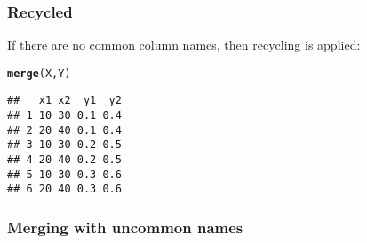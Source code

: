 \documentclass[12pt]{beamer}\usepackage[]{graphicx}\usepackage[]{color}
\makeatletter
\newcommand{\hlstd}[1]{\textcolor[rgb]{0.345,0.345,0.345}{#1}}%
\newcommand{\hlkwd}[1]{\textcolor[rgb]{0.737,0.353,0.396}{\textbf{#1}}}%
\newenvironment{kframe}{%
 \def\at@end@of@kframe{}%
 \ifinner\ifhmode%
  \def\at@end@of@kframe{\end{minipage}}%
  \begin{minipage}{\columnwidth}%
 \fi\fi%
 \def\FrameCommand##1{\hskip\@totalleftmargin \hskip-\fboxsep
 \colorbox{shadecolor}{##1}\hskip-\fboxsep
     \hskip-\linewidth \hskip-\@totalleftmargin \hskip\columnwidth}%
 \MakeFramed {\advance\hsize-\width
   \@totalleftmargin\z@ \linewidth\hsize
   \@setminipage}}%
 {\par\unskip\endMakeFramed%
 \at@end@of@kframe}
\newenvironment{knitrout}{}{} %
\makeatother
\begin{document}
\begin{frame}[fragile]
\frametitle{Recycled }

If there are no common column names, then recycling is applied:
\begin{knitrout}\footnotesize
{}\color{fgcolor}\begin{kframe}
\begin{alltt}
\hlkwd{merge}\hlstd{(X, Y)}
\end{alltt}
\begin{verbatim}
##   x1 x2  y1  y2
## 1 10 30 0.1 0.4
## 2 20 40 0.1 0.4
## 3 10 30 0.2 0.5
## 4 20 40 0.2 0.5
## 5 10 30 0.3 0.6
## 6 20 40 0.3 0.6
\end{verbatim}
\end{kframe}
\end{knitrout}

\end{frame}


\begin{frame}[fragile]
\frametitle{Merging with uncommon names}
\begin{center}
\end{center}
\end{frame}


\begin{frame}
\begin{center}
\Huge{}
\end{center}
\end{frame}

\end{document}
